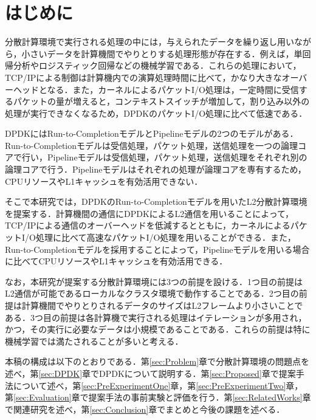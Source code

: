 \section{はじめに}
\label{sec:Background}
分散計算環境で実行される処理の中には，与えられたデータを繰り返し用いながら，小さいデータを計算機間でやりとりする処理形態が存在する．例えば，単回帰分析やロジスティック回帰などの機械学習である．これらの処理において，TCP/IPによる制御は計算機内での演算処理時間に比べて，かなり大きなオーバーヘッドとなる．また，カーネルによるパケットI/O処理は，一定時間に受信するパケットの量が増えると，コンテキストスイッチが増加して，割り込み以外の処理が実行できなくなるため，DPDKのパケットI/O処理に比べて低速である．

DPDKにはRun-to-CompletionモデルとPipelineモデルの2つのモデルがある．Run-to-Completionモデルは受信処理，パケット処理，送信処理を一つの論理コアで行い，Pipelineモデルは受信処理，パケット処理，送信処理をそれぞれ別の論理コアで行う．Pipelineモデルはそれぞれの処理が論理コアを専有するため，CPUリソースやL1キャッシュを有効活用できない．

そこで本研究では，DPDKのRun-to-Completionモデルを用いたL2分散計算環境を提案する．計算機間の通信にDPDKによるL2通信を用いることによって，TCP/IPによる通信のオーバーヘッドを低減するとともに，カーネルによるパケットI/O処理に比べて高速なパケットI/O処理を用いることができる．また，Run-to-Completionモデルを採用することによって，Pipelineモデルを用いる場合に比べてCPUリソースやL1キャッシュを有効活用できる．

なお，本研究が提案する分散計算環境には3つの前提を設ける．1つ目の前提はL2通信が可能であるローカルなクラスタ環境で動作することである．2つ目の前提は計算機間でやりとりされるデータのサイズはL2フレームより小さいことである．3つ目の前提は各計算機で実行される処理はイテレーションが多用され，かつ，その実行に必要なデータは小規模であることである．これらの前提は特に機械学習では満たされることが多いと考える．

本稿の構成は以下のとおりである．第\ref{sec:Problem}章で分散計算環境の問題点を述べ，第\ref{sec:DPDK}章でDPDKについて説明する．第\ref{sec:Proposed}章で提案手法について述べ，第\ref{sec:PreExperimentOne}章，第\ref{sec:PreExperimentTwo}章，第\ref{sec:Evaluation}章で提案手法の事前実験と評価を行う．第\ref{sec:RelatedWorks}章で関連研究を述べ，第\ref{sec:Conclusion}章でまとめと今後の課題を述べる．
